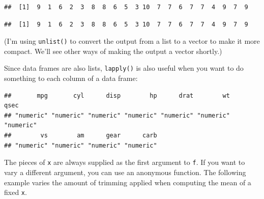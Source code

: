 \begin{verbatim}
##  [1]  9  1  6  2  3  8  8  6  5  3 10  7  7  6  7  7  4  9  7  9
\end{verbatim}

\begin{Shaded}
\begin{Highlighting}[]
\NormalTok{(}
\end{Highlighting}
\end{Shaded}

\begin{verbatim}
##  [1]  9  1  6  2  3  8  8  6  5  3 10  7  7  6  7  7  4  9  7  9
\end{verbatim}

(I'm using \texttt{unlist()} to convert the output from a list to a
vector to make it more compact. We'll see other ways of making the
output a vector shortly.)

Since data frames are also lists, \texttt{lapply()} is also useful when
you want to do something to each column of a data frame:

\begin{Shaded}
\begin{Highlighting}[]
\NormalTok{(}
\end{Highlighting}
\end{Shaded}

\begin{verbatim}
##       mpg       cyl      disp        hp      drat        wt      qsec 
## "numeric" "numeric" "numeric" "numeric" "numeric" "numeric" "numeric" 
##        vs        am      gear      carb 
## "numeric" "numeric" "numeric" "numeric"
\end{verbatim}

\begin{Shaded}
\begin{Highlighting}[]
\StringTok{ }\OperatorTok{/}\StringTok{ }
\end{Highlighting}
\end{Shaded}

The pieces of \texttt{x} are always supplied as the first argument to
\texttt{f}. If you want to vary a different argument, you can use an
anonymous function. The following example varies the amount of trimming
applied when computing the mean of a fixed \texttt{x}.

